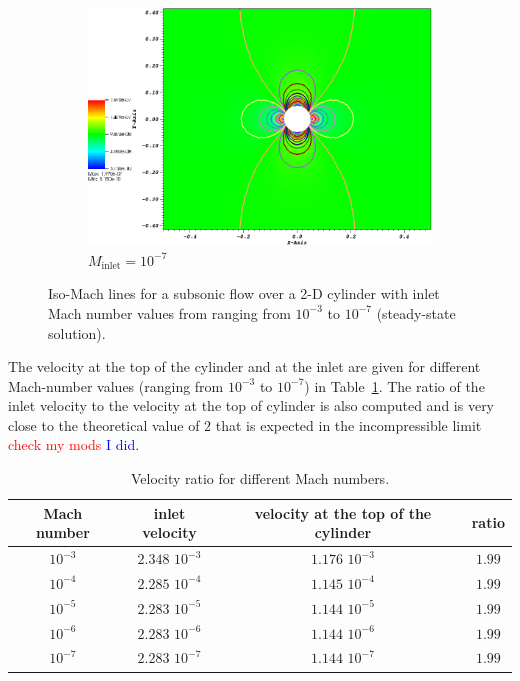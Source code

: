 \documentclass[preprint,10pt]{elsarticle}
\newcommand{\tbl}[1]{Table~\ref{#1}}                     %
\newcommand{\tcr}[1]{\textcolor{red}{#1}}
\newcommand{\tcb}[1]{\textcolor{blue}{#1}}
\begin{document}
\begin{figure}[H]
        \begin{subfigure}[b]{0.495\textwidth}
                \centering
                \includegraphics[width=\textwidth]{CylinderMach1em7ZoomIn.png}
                \caption{$M_{\text{inlet}}=10^{-7}$}
                \label{fig:cyl_1em7}
        \end{subfigure}
        \caption{Iso-Mach lines for a subsonic flow over a 2-D cylinder with inlet Mach number values from ranging from $10^{-3}$ to $10^{-7}$ (steady-state solution).}
				\label{fig:cylinder}
\end{figure}
%
The velocity at the top of the cylinder and at the inlet are given for different Mach-number values (ranging from $10^{-3}$ to $10^{-7}$) in \tbl{tbl:velocity_ratio}. The ratio of the inlet velocity to the velocity at the top of cylinder is also computed and is very close to the theoretical value of $2$ that is expected in the incompressible limit \tcr{check my mods} \tcb{I did}.
%
\begin{table}[H]
\begin{center}
 \caption{\label{tbl:velocity_ratio}Velocity ratio for different Mach numbers.}
\begin{tabular}{|c|c|c|c|}
\hline
Mach number & inlet velocity & velocity at the top of the cylinder & ratio \\ \hline
$10^{-3}$ & $2.348$ $10^{-3}$ & $1.176$ $10^{-3}$& $1.99$  \\ \hline
$10^{-4}$ & $2.285$ $10^{-4}$ & $1.145$ $10^{-4}$& $1.99$  \\ \hline
$10^{-5}$ & $2.283$ $10^{-5}$ & $1.144$ $10^{-5}$ & $1.99$ \\ \hline
$10^{-6}$ & $2.283$ $10^{-6}$ & $1.144$ $10^{-6}$ & $1.99$ \\ \hline
$10^{-7}$ & $2.283$ $10^{-7}$ & $1.144$ $10^{-7}$ & $1.99$ \\ \hline
\end{tabular}
\end{center}
\nonumber
\end{table}
\end{document}
